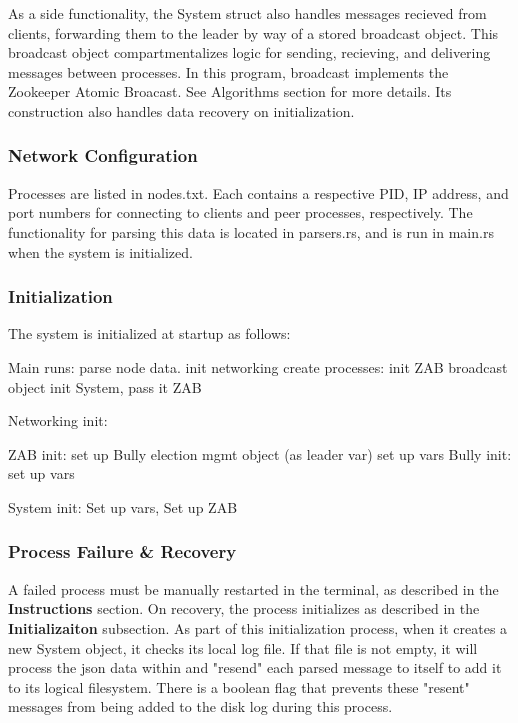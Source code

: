 \documentclass{article}
\begin{document}
        As a side functionality, the System struct also handles messages recieved from clients, forwarding them to the leader by way of a stored broadcast object. This broadcast object compartmentalizes logic for sending, recieving, and delivering messages between processes. In this program, broadcast implements the Zookeeper Atomic Broacast. See Algorithms section for more details. Its construction also handles data recovery on initialization.

    \subsubsection*{Network Configuration}
        Processes are listed in nodes.txt. Each contains a respective PID, IP address, and port numbers for connecting to clients and peer processes, respectively. The functionality for parsing this data is located in parsers.rs, and is run in main.rs when the system is initialized.

    \subsubsection*{Initialization}
        The system is initialized at startup as follows:

        Main runs:
                parse node data.
                init networking
                create processes:
                    init ZAB broadcast object
                    init System, pass it ZAB

        Networking init:

        ZAB init:
                set up Bully election mgmt object (as leader var)
                set up vars
        Bully init:
                set up vars

        System init:
                Set up vars,
                Set up ZAB



    \subsubsection*{Process Failure \& Recovery}
        A failed process must be manually restarted in the terminal, as described in the \textbf{Instructions} section. On recovery, the process initializes as described in the \textbf{Initializaiton} subsection. As part of this initialization process, when it creates a new System object, it checks its local log file. If that file is not empty, it will process the json data within and "resend" each parsed message to itself to add it to its logical filesystem. There is a boolean flag that prevents these "resent" messages from being added to the disk log during this process.
\end{document}
